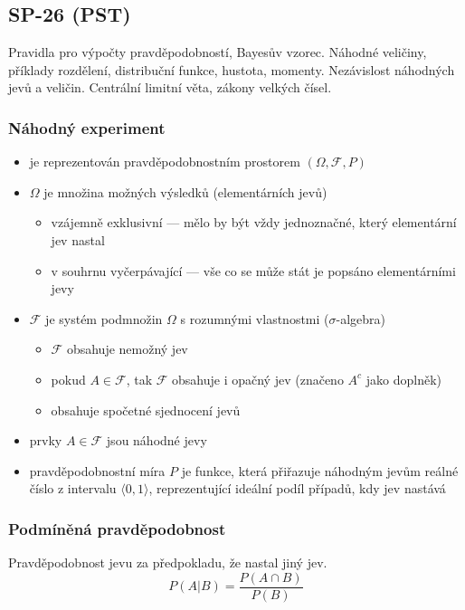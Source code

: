 \subsection{SP-26 (PST)}
Pravidla pro výpočty pravděpodobností, Bayesův vzorec. Náhodné veličiny, příklady rozdělení, distribuční funkce, hustota, momenty. Nezávislost náhodných jevů a veličin. Centrální limitní věta, zákony velkých čísel.

\subsubsection*{Náhodný experiment}
\begin{itemize}
	\item je reprezentován pravděpodobnostním prostorem $(\Omega, \mathcal{F}, P)$
	\item $\Omega$ je množina možných výsledků (elementárních jevů)
	\begin{itemize}
		\item vzájemně exklusivní --- mělo by být vždy jednoznačné, který elementární jev nastal
		\item v souhrnu vyčerpávající --- vše co se může stát je popsáno elementárními jevy
	\end{itemize}
	\item $\mathcal{F}$ je systém podmnožin $\Omega$ s rozumnými vlastnostmi ($\sigma$-algebra)
	\begin{itemize}
		\item $\mathcal{F}$ obsahuje nemožný jev
		\item pokud $A \in \mathcal{F}$, tak $\mathcal{F}$ obsahuje i opačný jev (značeno $A^c$ jako doplněk)
		\item obsahuje spočetné sjednocení jevů
	\end{itemize}
	\item prvky $A \in \mathcal{F}$ jsou náhodné jevy
	\item pravděpodobnostní míra $P$ je funkce, která přiřazuje náhodným jevům reálné číslo z intervalu $\langle 0,1 \rangle$, reprezentující ideální podíl případů, kdy jev nastává 
\end{itemize}

\subsubsection*{Podmíněná pravděpodobnost}
Pravděpodobnost jevu za předpokladu, že nastal jiný jev. $$P(A|B) = \frac{P(A \cap B)}{P(B)}$$

